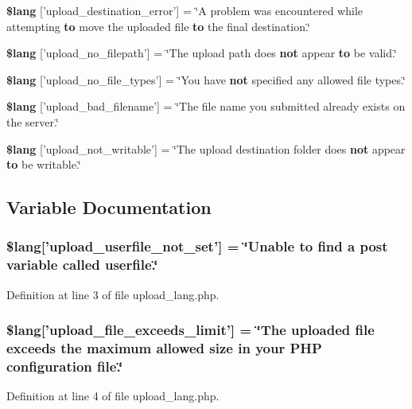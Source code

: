 \begin{DoxyCompactItemize}
\item 
{\bf \$lang} ['upload\-\_\-destination\-\_\-error'] = \char`\"{}A problem was encountered while attempting {\bf to} move the uploaded file {\bf to} the final destination.\char`\"{}
\item 
{\bf \$lang} ['upload\-\_\-no\-\_\-filepath'] = \char`\"{}The upload path does {\bf not} appear {\bf to} be valid.\char`\"{}
\item 
{\bf \$lang} ['upload\-\_\-no\-\_\-file\-\_\-types'] = \char`\"{}You have {\bf not} specified any allowed file types.\char`\"{}
\item 
{\bf \$lang} ['upload\-\_\-bad\-\_\-filename'] = \char`\"{}The file name you submitted already exists on the server.\char`\"{}
\item 
{\bf \$lang} ['upload\-\_\-not\-\_\-writable'] = \char`\"{}The upload destination folder does {\bf not} appear {\bf to} be writable.\char`\"{}
\end{DoxyCompactItemize}


\subsection{Variable Documentation}
\subsubsection[{\$lang}]{\setlength{\rightskip}{0pt plus 5cm}\$lang['upload\-\_\-userfile\-\_\-not\-\_\-set'] = \char`\"{}Unable {\bf to} find {\bf a} post variable called userfile.\char`\"{}}\label{upload__lang_8php_a6d12ff4074b1e4c6f22a4a5107fae5ee}


Definition at line 3 of file upload\-\_\-lang.\-php.

\subsubsection[{\$lang}]{\setlength{\rightskip}{0pt plus 5cm}\$lang['upload\-\_\-file\-\_\-exceeds\-\_\-limit'] = \char`\"{}The uploaded file exceeds the maximum allowed size in your P\-H\-P configuration file.\char`\"{}}\label{upload__lang_8php_a9028f049ebbe292a27e0e2b2e5f7d660}


Definition at line 4 of file upload\-\_\-lang.\-php.

